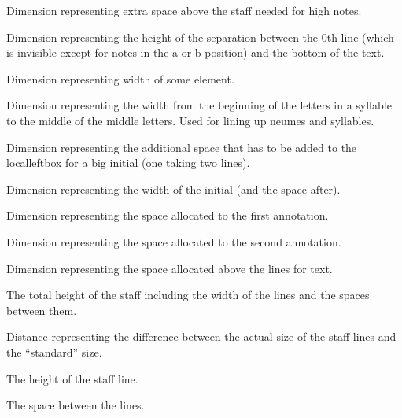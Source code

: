 Dimension representing extra space above the staff needed for high notes.

Dimension representing the height of the separation between the 0th
line (which is invisible except for notes in the a or b position) and
the bottom of the text.

Dimension representing width of some element.

Dimension representing the width from the beginning of the letters in
a syllable to the middle of the middle letters.  Used for lining up
neumes and syllables.

Dimension representing the additional space that has to be added to
the localleftbox for a big initial (one taking two lines).

Dimension representing the width of the initial (and the space after).

Dimension representing the space allocated to the first annotation.

Dimension representing the space allocated to the second annotation.

Dimension representing the space allocated above the lines for text.	

The total height of the staff including the width of the lines and the spaces between them.

Distance representing the difference between the actual size of the staff lines and the ``standard'' size.

The height of the staff line.

The space between the lines.

